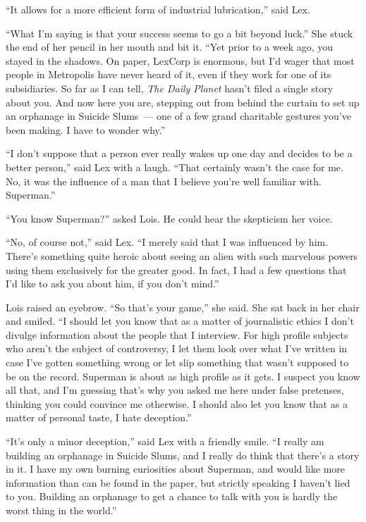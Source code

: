 \documentclass[ebook,12pt]{memoir}
\begin{document}
``It allows for a more efficient form of industrial lubrication,'' said
Lex.

``What I'm saying is that your success seems to go a bit beyond luck.''
She stuck the end of her pencil in her mouth and bit it. ``Yet prior to
a week ago, you stayed in the shadows. On paper, LexCorp is enormous,
but I'd wager that most people in Metropolis have never heard of it,
even if they work for one of its subsidiaries. So far as I can tell,
\emph{The Daily Planet} hasn't filed a single story about you. And now
here you are, stepping out from behind the curtain to set up an
orphanage in Suicide Slums~--- one of a few grand charitable gestures
you've been making. I have to wonder why.''

``I don't suppose that a person ever really wakes up one day and decides
to be a better person,'' said Lex with a laugh. ``That certainly wasn't
the case for me. No, it was the influence of a man that I believe you're
well familiar with. Superman.''

``You know Superman?'' asked Lois. He could hear the skepticism her
voice.

``No, of course not,'' said Lex. ``I merely said that I was influenced
by him. There's something quite heroic about seeing an alien with such
marvelous powers using them exclusively for the greater good. In fact, I
had a few questions that I'd like to ask you about him, if you don't
mind.''

Lois raised an eyebrow. ``So that's your game,'' she said. She sat back
in her chair and smiled. ``I should let you know that as a matter of
journalistic ethics I don't divulge information about the people that I
interview. For high profile subjects who aren't the subject of
controversy, I let them look over what I've written in case I've gotten
something wrong or let slip something that wasn't supposed to be on the
record. Superman is about as high profile as it gets. I suspect you know
all that, and I'm guessing that's why you asked me here under false
pretenses, thinking you could convince me otherwise. I should also let
you know that as a matter of personal taste, I hate deception.''

``It's only a minor deception,'' said Lex with a friendly smile. ``I
really am building an orphanage in Suicide Slums, and I really do think
that there's a story in it. I have my own burning curiosities about
Superman, and would like more information than can be found in the
paper, but strictly speaking I haven't lied to you. Building an
orphanage to get a chance to talk with you is hardly the worst thing in
the world.''
\end{document}
